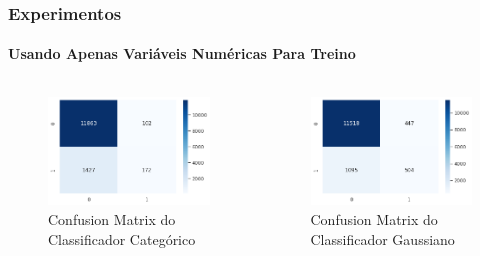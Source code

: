 \documentclass{beamer}
\begin{document}
\begin{frame}
    \frametitle{Experimentos}
    \framesubtitle{Usando Apenas Variáveis Numéricas Para Treino}
    \begin{columns}
        \begin{column}{0.5\textwidth}
            \begin{figure}[H]
                \centerline{\includegraphics[width=1.0\textwidth]{IMGS/cm-cnb-numeric.png}}
                
                \caption{\label{fig:cm3-cnb}Confusion Matrix do Classificador Categórico}
            \end{figure}
            
        \end{column}
        \begin{column}{0.5\textwidth}
            \begin{figure}[H]
                \centerline{\includegraphics[width=1.0\textwidth]{IMGS/cm-gnb-numeric.png}}
                \caption{\label{fig:cm3-gnb}Confusion Matrix do Classificador Gaussiano}
            \end{figure}
        \end{column}
        \end{columns}    
\end{frame}
\end{document}
